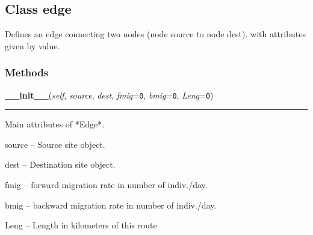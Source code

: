 
\subsection{Class edge}

    \label{Epigrass:simobj:edge}
Defines an edge connecting two nodes (node source to node dest). with 
attributes given by value.



  \subsubsection{Methods}

    \label{Epigrass:simobj:edge:__init__}

    \vspace{0.5ex}

    \begin{boxedminipage}{\textwidth}

    \raggedright \textbf{\_\_init\_\_}(\textit{self}, \textit{source}, \textit{dest}, \textit{fmig}=\texttt{0}, \textit{bmig}=\texttt{0}, \textit{Leng}=\texttt{0})

    \vspace{-1.5ex}

    \rule{\textwidth}{0.5\fboxrule}
    Main attributes of *Edge*.

    source -- Source site object.

    dest -- Destination site object.

    fmig -- forward migration rate in number of indiv./day.

    bmig -- backward migration rate in number of indiv./day.

    Leng -- Length in kilometers of this route

    \vspace{1ex}

    \end{boxedminipage}

